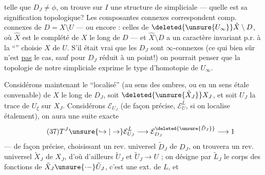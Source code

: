 
telle que $D_J\ne\phi$,  on trouve sur $I$ une structure de   simpliciale --- quelle est sa signification topologique? Les composantes connexes correspondent comp. connexes de $D=X\setminus U$ --- ou encore : celles de $\deleted{\unsure{U_\infty}}\hat X\setminus D$, où $\hat X$ est le  complété de $X$ le long de $D$ --- et $\hat X\setminus D$ a un caractère invariant p.r. à la ``'' choisie $X$ de $U$. S'il était vrai que les $D_J$  sont $\infty$-connexes (ce qui bien sûr n'est \uline{pas} le cas, sauf pour $D_J$ réduit à un point!) on pourrait penser que la topologie de notre   simpliciale exprime le type d'homotopie de $U_\infty$.

Considérons maintenant le ``localisé''  (au sens des ombres, ou en un sens étale convenable) de $X$ le long de $D_J$, soit $\deleted{\unsure{\hat X_J}}X_J$, et soit $U_J$  la trace de $U_\xi$ sur $X_J$. Considérons $\mathcal E_{U_J}$ (de façon précise, $\mathcal E_U^{\bar L}$, si on localise  étalement), on aura une suite exacte
\[
\tag{37}
T^J\unsure{\hookrightarrow|\to}\mathcal E_{U_J}^{\bar L}\longrightarrow\mathcal E_{D_J}^{\deleted{\unsure{\tilde D_J}}}\longrightarrow1
\]
--- de façon précise, choisissant un rev. universel $\tilde D_J$ de $D_J$, on trouvera un rev. universel  $\tilde X_J$ de $X_J$, d'où d'ailleurs $\tilde U_J$ et $\tilde U_J\longrightarrow U$ ;  on désigne par $\tilde L_J$ le corps des fonctions de $\tilde X_J\unsure{\mathrel{\cdot-}}\tilde U_J$, c'est une ext.  de $L$, et




